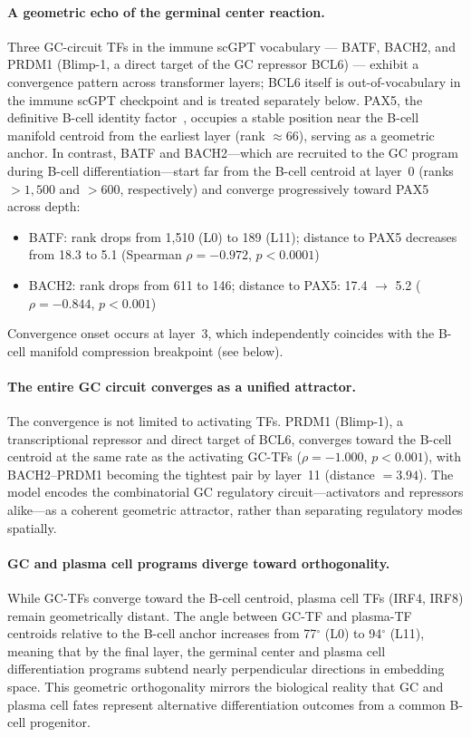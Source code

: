 \documentclass[12pt]{article}
\begin{document}
\paragraph{A geometric echo of the germinal center reaction.}
Three GC-circuit TFs in the immune scGPT vocabulary --- BATF, BACH2, and PRDM1 (Blimp-1, a direct target of the GC repressor BCL6) --- exhibit a convergence pattern across transformer layers; BCL6 itself is out-of-vocabulary in the immune scGPT checkpoint and is treated separately below.
PAX5, the definitive B-cell identity factor~\cite{cobaleda2007pax5}, occupies a stable position near the B-cell manifold centroid from the earliest layer (rank $\approx 66$), serving as a geometric anchor.
In contrast, BATF and BACH2---which are recruited to the GC program during B-cell differentiation---start far from the B-cell centroid at layer~0 (ranks $> 1{,}500$ and $> 600$, respectively) and converge progressively toward PAX5 across depth:
\begin{itemize}
  \item BATF: rank drops from 1{,}510 (L0) to 189 (L11); distance to PAX5 decreases from 18.3 to 5.1 (Spearman $\rho = -0.972$, $p < 0.0001$)
  \item BACH2: rank drops from 611 to 146; distance to PAX5: 17.4 $\to$ 5.2 ($\rho = -0.844$, $p < 0.001$)
\end{itemize}
Convergence onset occurs at layer~3, which independently coincides with the B-cell manifold compression breakpoint (see below).

\paragraph{The entire GC circuit converges as a unified attractor.}
The convergence is not limited to activating TFs.
PRDM1 (Blimp-1), a transcriptional repressor and direct target of BCL6, converges toward the B-cell centroid at the same rate as the activating GC-TFs ($\rho = -1.000$, $p < 0.001$), with BACH2--PRDM1 becoming the tightest pair by layer~11 (distance $= 3.94$).
The model encodes the combinatorial GC regulatory circuit---activators and repressors alike---as a coherent geometric attractor, rather than separating regulatory modes spatially.

\paragraph{GC and plasma cell programs diverge toward orthogonality.}
While GC-TFs converge toward the B-cell centroid, plasma cell TFs (IRF4, IRF8) remain geometrically distant.
The angle between GC-TF and plasma-TF centroids relative to the B-cell anchor increases from 77$^\circ$ (L0) to 94$^\circ$ (L11), meaning that by the final layer, the germinal center and plasma cell differentiation programs subtend nearly perpendicular directions in embedding space.
This geometric orthogonality mirrors the biological reality that GC and plasma cell fates represent alternative differentiation outcomes from a common B-cell progenitor.
\end{document}
